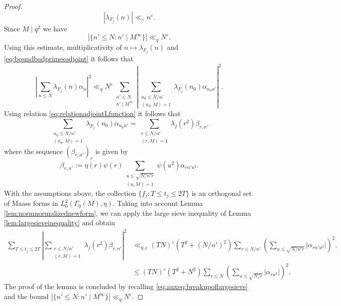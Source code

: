 \documentclass{article}
\theoremstyle{named}
\begin{document}
\begin{proof}
\begin{equation}\label{eq:boundbadprimesadjoint}
    |\lambda_{F_j}(n)| \ll_\varepsilon n^\varepsilon. 
\end{equation}
Since $M \mid q^2$ we have
\begin{equation*}
    |\{n' \leq N: n'\mid M^\infty\}| \ll_q N^\varepsilon.
\end{equation*}
Using this estimate, multiplicativity of $n\mapsto \lambda_{F_j}(n)$ and \eqref{eq:boundbadprimesadjoint} it follows that
\begin{equation}\label{eq:auxeq:breakupoflargesieve}
    \left|\sum_{n \leq N} \lambda_{F_j}(n)\alpha_n\right|^2 \ll_q N^\varepsilon \sum_{\substack{n' \leq N\\
    n' \mid M^\infty}} \left|\sum_{\substack{n_0 \leq N/n'\\
    (n_0, M) = 1}} \lambda_{F_j}(n_0)\alpha_{n_0n'}\right|^2.
\end{equation}
Using relation \eqref{eq:relationadjointLfunction} it follows that 
\begin{equation*}
    \sum_{\substack{n_0 \leq N/n'\\
    (n_0, M) = 1}} \lambda_{F_j}(n_0)\alpha_{n_0n'} = \sum_{\substack{r \leq N/n'\\
    (r, M) = 1}} \lambda_j(r^2) \beta_{r, n'}
\end{equation*}    
where the sequence $(\beta_{r, n'})_r$ is given by 
\begin{equation*}
\beta_{r, n'} := \overline{\eta(r)} \psi(r)\sum_{\substack{u \leq \sqrt{N/n'r}\\
    (u, M) = 1}}\psi(u^2)\alpha_{rn'u^2}.
\end{equation*}
With the assumptions above, the collection $\{f_j: T \leq t_j \leq 2T\}$ is an orthogonal set of Maass forms in $L_0^2(\Gamma_0(M), \eta)$. Taking into account Lemma \ref{lem:normnormalizednewform}, we can apply the large sieve inequality of Lemma \ref{lem:largesieveinequality} and obtain 
\begin{equation*}
\begin{aligned}
    \sum_{T \leq t_j \leq 2T}\left|\sum_{\substack{r \leq N/n'\\
    (r, M) = 1}} \lambda_j(r^2) \beta_{r, n'}\right|^2 & \ll_{q, \varepsilon} (TN)^\varepsilon (T^2 + (N/n')^2)\sum_{r \leq N/n'} \left(\sum_{u \leq \sqrt{N/n'r}} |\alpha_{rn'u^2}|\right)^2,\\
    & \leq (TN)^\varepsilon (T^2 + N^2)\sum_{r \leq N} \left(\sum_{u \leq \sqrt{N/r}} |\alpha_{ru^2}|\right)^2.
\end{aligned}
\end{equation*}
The proof of the lemma is concluded by recalling \eqref{eq:auxeq:breakupoflargesieve} and the bound $|\{n' \leq N: n'\mid M^\infty\}| \ll_q N^\varepsilon$.
\end{proof}
\end{document}
